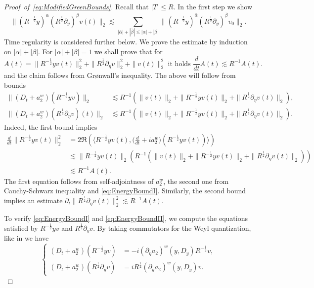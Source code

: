 \documentclass{amsart}
\theoremstyle{definition}
\begin{document}
\begin{proof}[Proof~of~\eqref{eq:ModifiedGreenBounds}]
Recall that $|T| \leq R$.
In the first step we show
\begin{equation}
\label{eq:EnergyArgumentsI}
\| (R^{-\frac{1}{2}} y)^{\alpha} (R^{\frac{1}{2}} \partial_{y})^{\beta} v(t) \|_2 \lesssim \sum_{|\bar{\alpha}| + |\bar{\beta}| \leq |\alpha| + |\beta|} \| (R^{-\frac{1}{2}} y)^{\bar{\alpha}} (R^{\frac{1}{2}} \partial_{y})^{\bar{\beta}} v_0 \|_2.
\end{equation}
Time regularity is considered further below. We prove the estimate by induction on $|\alpha| + |\beta|$. For $|\alpha| + |\beta| = 1$ we shall prove that for 
\begin{equation*}
A(t) = \| R^{-\frac{1}{2}} y v(t) \|_2^2 + \| R^{\frac{1}{2}} \partial_{\eta} v \|_2^2 + \| v(t) \|_2^2 \text{ it holds } \frac{d}{dt} A(t) \lesssim R^{-1} A(t).
\end{equation*}
and the claim follows from Gr\o nwall's inequality.
The above will follow from bounds
\begin{align}
\label{eq:EnergyBoundI}
\| (D_t + a_2^w) (R^{-\frac{1}{2}} y v) \|_2 &\lesssim R^{-1} (\| v(t) \|_2 + \| R^{-\frac{1}{2}} y v(t) \|_2 + \| R^{\frac{1}{2}} \partial_{\eta} v(t) \|_2), \\
\label{eq:EnergyBoundII}
\| (D_t + a_2^w) (R^{\frac{1}{2}} \partial_{\eta} v)(t) \|_2 &\lesssim R^{-1} ( \| v(t) \|_2 + \| R^{-\frac{1}{2}} y v(t) \|_2  + \| R^{\frac{1}{2}} \partial_{\eta} v(t) \|_2).
\end{align}
Indeed, the first bound implies
\begin{equation*}
\begin{split}
\frac{d}{dt} \| R^{-\frac{1}{2}} y v(t) \|_2^2 &= 2 \Re ( \langle R^{-\frac{1}{2}} y v(t) , \big( \frac{d}{dt} + i a_2^w \big) (R^{- \frac{1}{2}} y v(t)) \rangle ) \\
&\lesssim \| R^{-\frac{1}{2}} y v(t) \|_2 (R^{-1} ( \| v(t) \|_2 + \| R^{-\frac{1}{2}} y v(t) \|_2 + \| R^{\frac{1}{2}} \partial_{\eta} v(t) \|_2 ) ) \\
&\lesssim R^{-1} A(t).
\end{split}
\end{equation*}
The first equation follows from self-adjointness of $a_2^w$, the second one from Cauchy-Schwarz inequality and \eqref{eq:EnergyBoundI}. Similarly, the second bound implies an estimate $\partial_t \| R^{\frac{1}{2}} \partial_{\eta} v(t) \|_2^2 \lesssim R^{-1} A(t)$.

To verify \eqref{eq:EnergyBoundI} and \eqref{eq:EnergyBoundII}, we compute the equations satisfied by $R^{-\frac{1}{2}} y v$ and $R^{\frac{1}{2}} \partial_y v$. By taking commutators for the Weyl quantization, like in \cite[p.~238]{KochTataru05} we have
\begin{equation}
\label{eq:EnergyCommutator}
\left\{ \begin{array}{cl}
(D_t + a_{2}^w) (R^{-\frac{1}{2}} y v) &= - i (\partial_{\eta} a_{2})^w(y,D_y) R^{-\frac{1}{2}} v, \\
(D_t + a_{2}^w)(R^{\frac{1}{2}} \partial_y v) &= i R^{\frac{1}{2}} (\partial_y a_{2})^w(y,D_y) v.
\end{array} \right.
\end{equation}


\end{proof}
\end{document}

